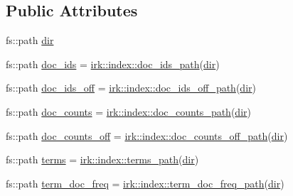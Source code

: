 \subsection*{Public Attributes}
\begin{DoxyCompactItemize}
\item 
fs\+::path \mbox{\hyperlink{structirk_1_1index_1_1metadata_a355b4325c022cd152e68fc18b1775fc6}{dir}}
\item 
fs\+::path \mbox{\hyperlink{structirk_1_1index_1_1metadata_a20168da918488d66694b1da2f0542b83}{doc\+\_\+ids}} = \mbox{\hyperlink{namespaceirk_1_1index_ac1625c6287b43b8f77d552c3340a2034}{irk\+::index\+::doc\+\_\+ids\+\_\+path}}(\mbox{\hyperlink{structirk_1_1index_1_1metadata_a355b4325c022cd152e68fc18b1775fc6}{dir}})
\item 
fs\+::path \mbox{\hyperlink{structirk_1_1index_1_1metadata_a249ece1de7a87e894345d7c987609e8e}{doc\+\_\+ids\+\_\+off}} = \mbox{\hyperlink{namespaceirk_1_1index_ae4d01a34d5e8b61eaef5cc0d21e18f10}{irk\+::index\+::doc\+\_\+ids\+\_\+off\+\_\+path}}(\mbox{\hyperlink{structirk_1_1index_1_1metadata_a355b4325c022cd152e68fc18b1775fc6}{dir}})
\item 
fs\+::path \mbox{\hyperlink{structirk_1_1index_1_1metadata_a1c98d482a721d75186ef3695d22263ea}{doc\+\_\+counts}} = \mbox{\hyperlink{namespaceirk_1_1index_a3af7dfad46ca16b7e1c84fa625779605}{irk\+::index\+::doc\+\_\+counts\+\_\+path}}(\mbox{\hyperlink{structirk_1_1index_1_1metadata_a355b4325c022cd152e68fc18b1775fc6}{dir}})
\item 
fs\+::path \mbox{\hyperlink{structirk_1_1index_1_1metadata_a40270e89d8b3b63d01a2c7da3a3e3748}{doc\+\_\+counts\+\_\+off}} = \mbox{\hyperlink{namespaceirk_1_1index_a038babf1f6aece61737ccb3c5984d75e}{irk\+::index\+::doc\+\_\+counts\+\_\+off\+\_\+path}}(\mbox{\hyperlink{structirk_1_1index_1_1metadata_a355b4325c022cd152e68fc18b1775fc6}{dir}})
\item 
fs\+::path \mbox{\hyperlink{structirk_1_1index_1_1metadata_ac3c1d47e784d486a72d249cc5b7675d2}{terms}} = \mbox{\hyperlink{namespaceirk_1_1index_a5453ea8070a0840ba13036ebcdf24fc1}{irk\+::index\+::terms\+\_\+path}}(\mbox{\hyperlink{structirk_1_1index_1_1metadata_a355b4325c022cd152e68fc18b1775fc6}{dir}})
\item 
fs\+::path \mbox{\hyperlink{structirk_1_1index_1_1metadata_a620a29ca94ec440938aa5468c96a68fa}{term\+\_\+doc\+\_\+freq}} = \mbox{\hyperlink{namespaceirk_1_1index_a18866e660d3b9982f7f3b9c79dc410c6}{irk\+::index\+::term\+\_\+doc\+\_\+freq\+\_\+path}}(\mbox{\hyperlink{structirk_1_1index_1_1metadata_a355b4325c022cd152e68fc18b1775fc6}{dir}})

\end{DoxyCompactItemize}
